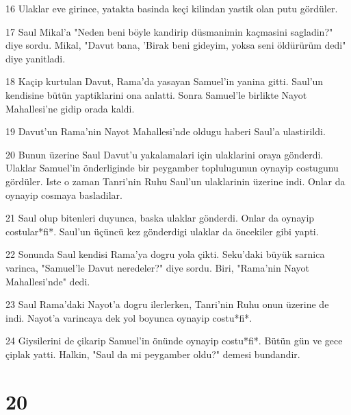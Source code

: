 \par 16 Ulaklar eve girince, yatakta basinda keçi kilindan yastik olan putu gördüler.
\par 17 Saul Mikal'a "Neden beni böyle kandirip düsmanimin kaçmasini sagladin?" diye sordu. Mikal, "Davut bana, 'Birak beni gideyim, yoksa seni öldürürüm dedi" diye yanitladi.
\par 18 Kaçip kurtulan Davut, Rama'da yasayan Samuel'in yanina gitti. Saul'un kendisine bütün yaptiklarini ona anlatti. Sonra Samuel'le birlikte Nayot Mahallesi'ne gidip orada kaldi.
\par 19 Davut'un Rama'nin Nayot Mahallesi'nde oldugu haberi Saul'a ulastirildi.
\par 20 Bunun üzerine Saul Davut'u yakalamalari için ulaklarini oraya gönderdi. Ulaklar Samuel'in önderliginde bir peygamber toplulugunun oynayip costugunu gördüler. Iste o zaman Tanri'nin Ruhu Saul'un ulaklarinin üzerine indi. Onlar da oynayip cosmaya basladilar.
\par 21 Saul olup bitenleri duyunca, baska ulaklar gönderdi. Onlar da oynayip costular*fi*. Saul'un üçüncü kez gönderdigi ulaklar da öncekiler gibi yapti.
\par 22 Sonunda Saul kendisi Rama'ya dogru yola çikti. Seku'daki büyük sarnica varinca, "Samuel'le Davut neredeler?" diye sordu. Biri, "Rama'nin Nayot Mahallesi'nde" dedi.
\par 23 Saul Rama'daki Nayot'a dogru ilerlerken, Tanri'nin Ruhu onun üzerine de indi. Nayot'a varincaya dek yol boyunca oynayip costu*fi*.
\par 24 Giysilerini de çikarip Samuel'in önünde oynayip costu*fi*. Bütün gün ve gece çiplak yatti. Halkin, "Saul da mi peygamber oldu?" demesi bundandir.

\chapter{20}

